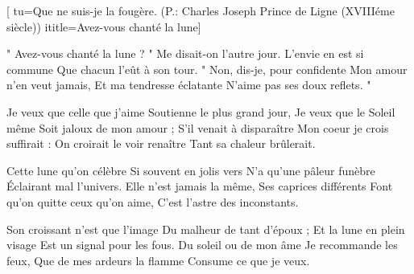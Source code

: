 [
tu={Que ne suis-je la fougère. (P.: Charles Joseph Prince de Ligne (XVIIIéme siècle))}
ititle={Avez-vous chanté la lune}]

\beginverse
" Avez-vous chanté la lune ? "
Me disait-on l'autre jour.
L'envie en est si commune
Que chacun l'eût à son tour.
" Non, dis-je, pour confidente
Mon amour n'en veut jamais,
Et ma tendresse éclatante
N'aime pas ses doux reflets. "
\endverse

\beginverse
Je veux que celle que j'aime
Soutienne le plus grand jour,
Je veux que le Soleil même
Soit jaloux de mon amour ;
S'il venait à disparaître
Mon coeur je crois suffirait :
On croirait le voir renaître
Tant sa chaleur brûlerait.
\endverse

\beginverse
Cette lune qu'on célèbre
Si souvent en jolis vers
N'a qu'une pâleur funèbre
Éclairant mal l'univers.
Elle n'est jamais la même,
Ses caprices différents
Font qu'on quitte ceux qu'on aime,
C'est l'astre des inconstants.
\endverse

\beginverse
Son croissant n'est que l'image
Du malheur de tant d'époux ;
Et la lune en plein visage
Est un signal pour les fous.
Du soleil ou de mon âme
Je recommande les feux,
Que de mes ardeurs la flamme
Consume ce que je veux.
\endverse

\endsong